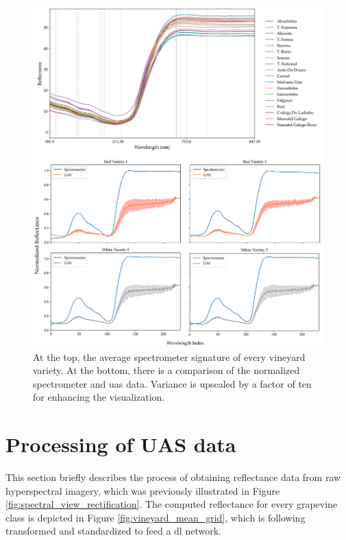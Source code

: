 \begin{figure}[ht]
    \centering
    \includegraphics[width=\linewidth]{figs/vineyard_classification/spectrometer_varieties.png}
	\caption{At the top, the average spectrometer signature of every vineyard variety. At the bottom, there is a comparison of the normalized spectrometer and \acrshort{uas} data. Variance is upscaled by a factor of ten for enhancing the visualization.}
	\label{fig:spectrometer_uav_data}
\end{figure}

\section{Processing of UAS data}
\label{sec:vineyard_hyperspectral_processing}

This section briefly describes the process of obtaining reflectance data from raw hyperspectral imagery, which was previously illustrated in Figure \ref{fig:spectral_view_rectification}. The computed reflectance for every grapevine class is depicted in Figure \ref{fig:vineyard_mean_grid}, which is following transformed and standardized to feed a \acrshort{dl} network. 

